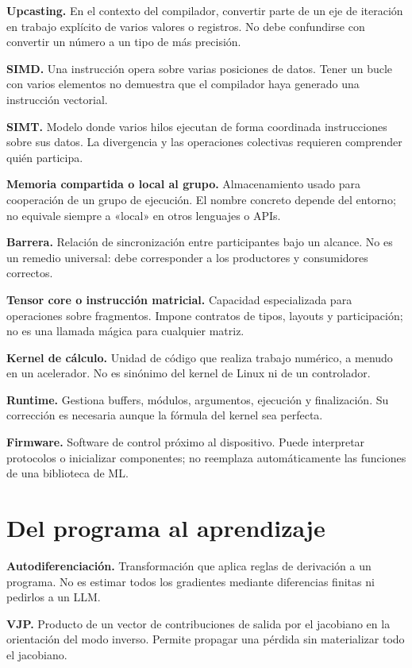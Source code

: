 \documentclass[12pt,a4paper,oneside]{report}
\begin{document}
\textbf{Upcasting.} En el contexto del compilador, convertir parte de un eje de iteración en trabajo explícito de varios valores o registros. No debe confundirse con convertir un número a un tipo de más precisión.

\textbf{SIMD.} Una instrucción opera sobre varias posiciones de datos. Tener un bucle con varios elementos no demuestra que el compilador haya generado una instrucción vectorial.

\textbf{SIMT.} Modelo donde varios hilos ejecutan de forma coordinada instrucciones sobre sus datos. La divergencia y las operaciones colectivas requieren comprender quién participa.

\textbf{Memoria compartida o local al grupo.} Almacenamiento usado para cooperación de un grupo de ejecución. El nombre concreto depende del entorno; no equivale siempre a «local» en otros lenguajes o APIs.

\textbf{Barrera.} Relación de sincronización entre participantes bajo un alcance. No es un remedio universal: debe corresponder a los productores y consumidores correctos.

\textbf{Tensor core o instrucción matricial.} Capacidad especializada para operaciones sobre fragmentos. Impone contratos de tipos, layouts y participación; no es una llamada mágica para cualquier matriz.

\textbf{Kernel de cálculo.} Unidad de código que realiza trabajo numérico, a menudo en un acelerador. No es sinónimo del kernel de Linux ni de un controlador.

\textbf{Runtime.} Gestiona buffers, módulos, argumentos, ejecución y finalización. Su corrección es necesaria aunque la fórmula del kernel sea perfecta.

\textbf{Firmware.} Software de control próximo al dispositivo. Puede interpretar protocolos o inicializar componentes; no reemplaza automáticamente las funciones de una biblioteca de ML.

\section{Del programa al aprendizaje}
\textbf{Autodiferenciación.} Transformación que aplica reglas de derivación a un programa. No es estimar todos los gradientes mediante diferencias finitas ni pedirlos a un LLM.

\textbf{VJP.} Producto de un vector de contribuciones de salida por el jacobiano en la orientación del modo inverso. Permite propagar una pérdida sin materializar todo el jacobiano.
\end{document}
